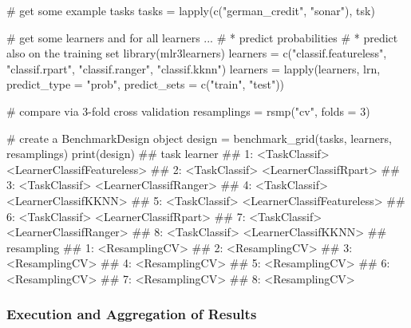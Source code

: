 \documentclass[]{article}
\newenvironment{Shaded}{}{}
\newcommand{\CommentTok}[1]{\textcolor[rgb]{0.00,0.50,0.00}{#1}}
\newcommand{\DataTypeTok}[1]{#1}
\newcommand{\DecValTok}[1]{#1}
\newcommand{\KeywordTok}[1]{\textcolor[rgb]{0.00,0.00,1.00}{#1}}
\newcommand{\NormalTok}[1]{#1}
\newcommand{\StringTok}[1]{\textcolor[rgb]{0.00,0.50,0.50}{#1}}
\renewenvironment{Shaded} {\begin{snugshade}\small} {\end{snugshade}}
\begin{document}
\begin{Shaded}
\begin{Highlighting}[]
\CommentTok{# get some example tasks}
\NormalTok{tasks =}\StringTok{ }\KeywordTok{lapply}\NormalTok{(}\KeywordTok{c}\NormalTok{(}\StringTok{"german_credit"}\NormalTok{, }\StringTok{"sonar"}\NormalTok{), tsk)}

\CommentTok{# get some learners and for all learners ...}
\CommentTok{# * predict probabilities}
\CommentTok{# * predict also on the training set}
\KeywordTok{library}\NormalTok{(mlr3learners)}
\NormalTok{learners =}\StringTok{ }\KeywordTok{c}\NormalTok{(}\StringTok{"classif.featureless"}\NormalTok{, }\StringTok{"classif.rpart"}\NormalTok{, }\StringTok{"classif.ranger"}\NormalTok{, }\StringTok{"classif.kknn"}\NormalTok{)}
\NormalTok{learners =}\StringTok{ }\KeywordTok{lapply}\NormalTok{(learners, lrn,}
  \DataTypeTok{predict_type =} \StringTok{"prob"}\NormalTok{, }\DataTypeTok{predict_sets =} \KeywordTok{c}\NormalTok{(}\StringTok{"train"}\NormalTok{, }\StringTok{"test"}\NormalTok{))}

\CommentTok{# compare via 3-fold cross validation}
\NormalTok{resamplings =}\StringTok{ }\KeywordTok{rsmp}\NormalTok{(}\StringTok{"cv"}\NormalTok{, }\DataTypeTok{folds =} \DecValTok{3}\NormalTok{)}

\CommentTok{# create a BenchmarkDesign object}
\NormalTok{design =}\StringTok{ }\KeywordTok{benchmark_grid}\NormalTok{(tasks, learners, resamplings)}
\KeywordTok{print}\NormalTok{(design)}
\NormalTok{##             task                     learner}
\NormalTok{## 1: <TaskClassif> <LearnerClassifFeatureless>}
\NormalTok{## 2: <TaskClassif>       <LearnerClassifRpart>}
\NormalTok{## 3: <TaskClassif>      <LearnerClassifRanger>}
\NormalTok{## 4: <TaskClassif>        <LearnerClassifKKNN>}
\NormalTok{## 5: <TaskClassif> <LearnerClassifFeatureless>}
\NormalTok{## 6: <TaskClassif>       <LearnerClassifRpart>}
\NormalTok{## 7: <TaskClassif>      <LearnerClassifRanger>}
\NormalTok{## 8: <TaskClassif>        <LearnerClassifKKNN>}
\NormalTok{##        resampling}
\NormalTok{## 1: <ResamplingCV>}
\NormalTok{## 2: <ResamplingCV>}
\NormalTok{## 3: <ResamplingCV>}
\NormalTok{## 4: <ResamplingCV>}
\NormalTok{## 5: <ResamplingCV>}
\NormalTok{## 6: <ResamplingCV>}
\NormalTok{## 7: <ResamplingCV>}
\NormalTok{## 8: <ResamplingCV>}
\end{Highlighting}
\end{Shaded}

\hypertarget{bm-exec}{%
\subsubsection{Execution and Aggregation of Results}\label{bm-exec}}
\end{document}
